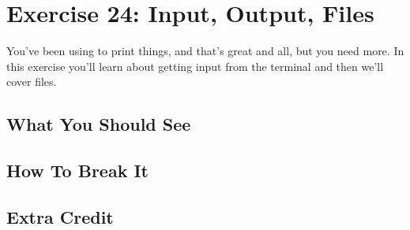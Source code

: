 \chapter{Exercise 24: Input, Output, Files}

You've been using  to print things, and that's great
and all, but you need more.  In this exercise you'll learn about 
getting input from the terminal and then we'll cover files.


\section{What You Should See}


\section{How To Break It}


\section{Extra Credit}



